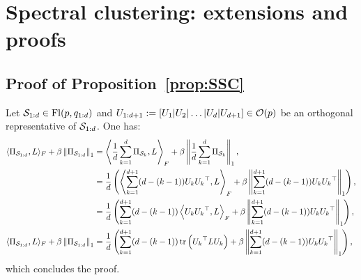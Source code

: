 \section{Spectral clustering: extensions and proofs}\label{app:SSC}


\subsection{Proof of Proposition~\ref{prop:SSC}}
Let $\mathcal{S}_{1:d} \in \operatorname{Fl}(p, q_{1:d})$ and $U_{1:d+1} := [U_1|U_2|\dots|U_d|U_{d+1}] \in \mathcal{O}(p)$ be an orthogonal representative of $\mathcal{S}_{1:d}$. One has:
\begin{align}
	\langle \Pi_{\mathcal{S}_{1:d}}, L\rangle_F + \beta \left\lVert\Pi_{\mathcal{S}_{1:d}}\right\rVert_1 &= \left\langle \frac1d\sum_{k=1}^d \Pi_{\mathcal{S}_k}, L\right\rangle_F + \beta \left\lVert\frac1d\sum_{k=1}^d \Pi_{\mathcal{S}_k}\right\rVert_1,\\
	&= \frac1d \left(\left\langle \sum_{k=1}^{d+1} (d - (k-1)) U_k {U_k}^\top, L\right\rangle_F + \beta \left\lVert\sum_{k=1}^{d+1} (d - (k-1)) U_k {U_k}^\top \right\rVert_1\right),\\
	&= \frac1d \left(\sum_{k=1}^{d+1} (d - (k-1)) \left\langle U_k {U_k}^\top, L\right\rangle_F + \beta \left\lVert\sum_{k=1}^{d+1} (d - (k-1)) U_k {U_k}^\top \right\rVert_1\right),\\
	\langle \Pi_{\mathcal{S}_{1:d}}, L\rangle_F + \beta \left\lVert\Pi_{\mathcal{S}_{1:d}}\right\rVert_1 &= \frac1d \left(\sum_{k=1}^{d+1} (d - (k-1)) \operatorname{tr}\left({U_k}^\top L U_k\right) + \beta \left\lVert\sum_{k=1}^{d+1} (d - (k-1)) U_k {U_k}^\top \right\rVert_1\right),
\end{align}
which concludes the proof.
